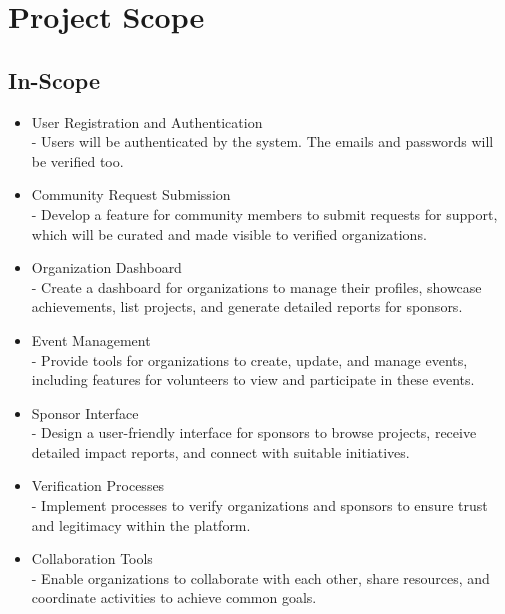 \section{Project Scope}
\subsection{In-Scope}

\begin{itemize}

	\item User Registration and Authentication\\       
        - Users will be authenticated by the system.
        The emails and passwords will be verified too.
        
        \item Community Request Submission\\
        - Develop a feature for community members to submit requests for support, which will be curated and made visible to verified organizations.
        
	\item Organization Dashboard\\
        - Create a dashboard for organizations to manage their profiles, showcase achievements, list projects, and generate detailed reports for sponsors.
        
	\item Event Management\\
        - Provide tools for organizations to create, update, and manage events, including features for volunteers to view and participate in these events.
        
	\item Sponsor Interface\\
        - Design a user-friendly interface for sponsors to browse projects, receive detailed impact reports, and connect with suitable initiatives.
        
	\item Verification Processes\\
        - Implement processes to verify organizations and sponsors to ensure trust and legitimacy within the platform.
        
	\item Collaboration Tools\\
        - Enable organizations to collaborate with each other, share resources, and coordinate activities to achieve common goals.
        

\end{itemize}
